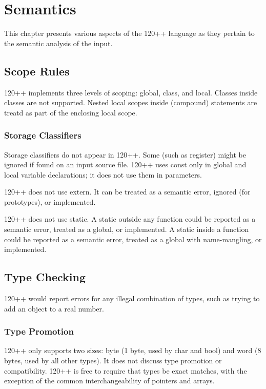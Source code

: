 \chapter{Semantics}

This chapter presents various aspects of the 120++ language as they
pertain to the semantic analysis of the input.

\section{Scope Rules}

120++ implements three levels of scoping: global, class, and local.
Classes inside classes are not supported.  Nested local scopes inside
(compound) statements are treatd as part of the enclosing local scope.

\subsection{Storage Classifiers}

Storage classifiers do not appear in 120++. Some (such as
register) might be ignored
if found on an input source file.
120++ uses const only in global and local variable declarations;
it does not use them in parameters.

120++ does not use extern. It can be treated as a semantic error,
ignored (for prototypes), or implemented.

120++ does not use static.  A static outside any function could be
reported as a semantic error, treated as a global, or implemented.
A static inside a function could be reported as a semantic error,
treated as a global with name-mangling, or implemented.

\section{Type Checking}

120++ would report errors for any illegal combination of types, such as
trying to add an object to a real number.

\subsection{Type Promotion}

120++ only supports two sizes: byte (1 byte, used by char and bool) 
and word (8 bytes, used by all other types).  It does not discuss
type promotion or compatibility. 120++ is free to require that types
be exact matches, with the exception of the common interchangeability
of pointers and arrays.

